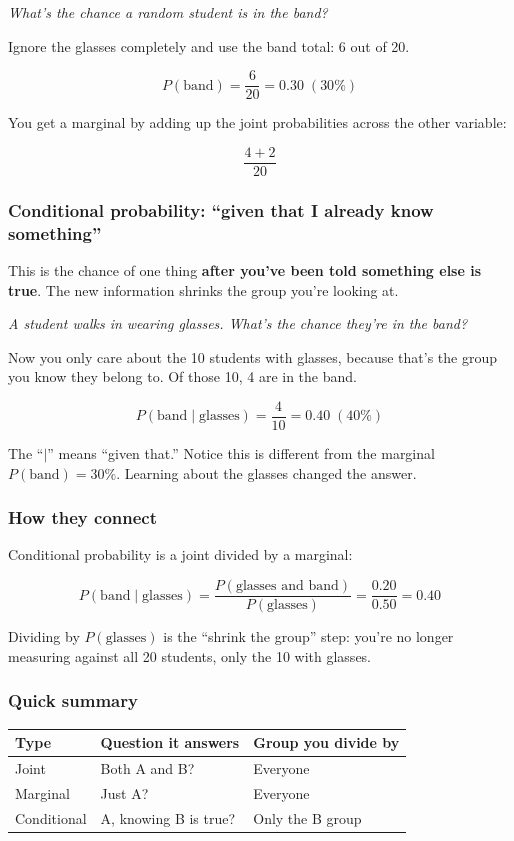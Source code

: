 \emph{What's the chance a random student is in the band?}

Ignore the glasses completely and use the band total: 6 out of 20.

\[
P(\text{band}) = \frac{6}{20} = 0.30 \; (30\%)
\]

You get a marginal by adding up the joint probabilities across the other variable:

\[
\frac{4 + 2}{20}
\]

\subsubsection*{Conditional probability: ``given that I already know something''}

This is the chance of one thing \textbf{after you've been told something else is true}. The new information shrinks the group you're looking at.

\emph{A student walks in wearing glasses. What's the chance they're in the band?}

Now you only care about the 10 students with glasses, because that's the group you know they belong to. Of those 10, 4 are in the band.

\[
P(\text{band} \mid \text{glasses}) = \frac{4}{10} = 0.40 \; (40\%)
\]

The ``$\mid$'' means ``given that.'' Notice this is different from the marginal $P(\text{band}) = 30\%$. Learning about the glasses changed the answer.

\subsubsection*{How they connect}

Conditional probability is a joint divided by a marginal:

\[
P(\text{band} \mid \text{glasses}) = \frac{P(\text{glasses and band})}{P(\text{glasses})} = \frac{0.20}{0.50} = 0.40
\]

Dividing by $P(\text{glasses})$ is the ``shrink the group'' step: you're no longer measuring against all 20 students, only the 10 with glasses.

\subsubsection*{Quick summary}

\begin{center}
\begin{tabular}{lll}
\toprule
Type & Question it answers & Group you divide by \\
\midrule
Joint & Both A and B? & Everyone \\
Marginal & Just A? & Everyone \\
Conditional & A, knowing B is true? & Only the B group \\
\bottomrule
\end{tabular}
\end{center}

